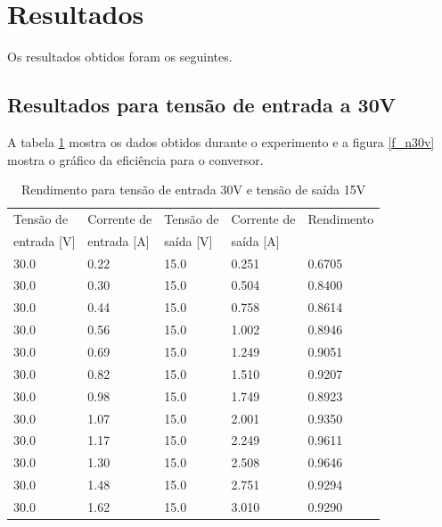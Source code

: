 \newpage
\section{Resultados}

Os resultados obtidos foram os seguintes.

\subsection{Resultados para tensão de entrada a 30V}

A tabela \ref{t_n30v} mostra os dados obtidos durante o experimento e a figura \ref{f_n30v} mostra o gráfico da eficiência para o conversor.

\begin{small}
	\begin{table}[H]
		\begin{center}
			\caption{Rendimento para tensão de entrada 30V e tensão de saída 15V}
			\begin{tabular}{l|l|l|l|l}
				\hline
				Tensão de & Corrente de & Tensão de  & Corrente de & Rendimento\\
				entrada [V]& entrada [A] & saída [V] & saída [A] &\\
				\hline
				30.0 & 0.22 & 15.0 & 0.251  & 0.6705\\
				\hline
				30.0 & 0.30 & 15.0 & 0.504  & 0.8400\\
				\hline
				30.0 & 0.44 & 15.0 & 0.758  & 0.8614\\
				\hline
				30.0 & 0.56 & 15.0 & 1.002  & 0.8946\\
				\hline
				30.0 & 0.69 & 15.0 & 1.249  & 0.9051\\
				\hline
				30.0 & 0.82 & 15.0 & 1.510 & 0.9207\\
				\hline
				30.0 & 0.98 & 15.0 & 1.749 & 0.8923\\
				\hline
				30.0 & 1.07 & 15.0 & 2.001  & 0.9350\\
				\hline
				30.0 & 1.17 & 15.0 & 2.249  & 0.9611\\
				\hline
				30.0 & 1.30 & 15.0 & 2.508  & 0.9646\\
				\hline
				30.0 & 1.48 & 15.0 & 2.751 & 0.9294\\
				\hline
				30.0 & 1.62 & 15.0 & 3.010 & 0.9290\\
				\hline
			\end{tabular}
			\label{t_n30v}
		\end{center}
	\end{table}
\end{small}

